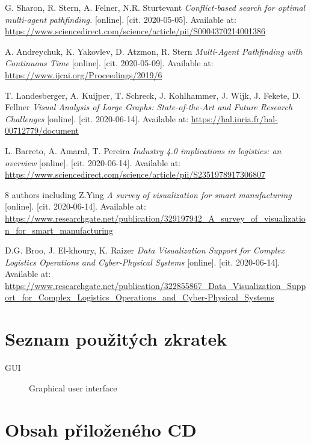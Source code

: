 \documentclass[thesis=B,english]{FITthesis}[2019/12/23]
\begin{document}
\begin{thebibliography}{10}

G. Sharon, R. Stern, A. Felner, N.R. Sturtevant \textit{Conflict-based search for optimal multi-agent pathfinding.} [online]. [cit. 2020-05-05]. Available at: \url{https://www.sciencedirect.com/science/article/pii/S0004370214001386}

A. Andreychuk, K. Yakovlev, D. Atzmon, R. Stern \textit{Multi-Agent Pathfinding with Continuous Time} [online]. [cit. 2020-05-09]. Available at: \url{https://www.ijcai.org/Proceedings/2019/6}

T. Landesberger, A. Kuijper, T. Schreck, J. Kohlhammer,
J. Wijk, J. Fekete, D. Fellner  \textit{Visual Analysis of Large Graphs: State-of-the-Art and Future Research Challenges} [online]. [cit. 2020-06-14]. Available at: \url{https://hal.inria.fr/hal-00712779/document}

L. Barreto, A. Amaral, T. Pereira \textit{Industry 4.0 implications in logistics: an overview} [online]. [cit. 2020-06-14]. Available at: \url{https://www.sciencedirect.com/science/article/pii/S2351978917306807}

8 authors including Z.Ying \textit{A survey of visualization for smart manufacturing} [online]. [cit. 2020-06-14]. Available at: \url{https://www.researchgate.net/publication/329197942_A_survey_of_visualization_for_smart_manufacturing}


D.G. Broo, J. El-khoury, K. Raizer \textit{Data Visualization Support for Complex Logistics Operations and Cyber-Physical Systems} [online]. [cit. 2020-06-14]. Available at: \url{https://www.researchgate.net/publication/322855867_Data_Visualization_Support_for_Complex_Logistics_Operations_and_Cyber-Physical_Systems}




\end{thebibliography}

\appendix

\chapter{Seznam použitých zkratek}
\begin{description}
	\item[GUI] Graphical user interface
\end{description}


\chapter{Obsah přiloženého CD}
\end{document}
